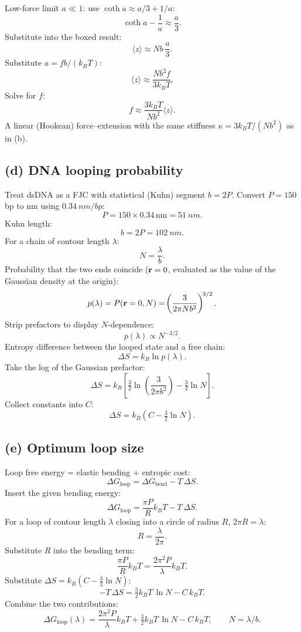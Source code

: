 \documentclass[11pt]{article}
\begin{document}
Low-force limit $a\ll 1$: use $\coth a\approx a/3 + 1/a$:
\[ \coth a - \frac{1}{a} \approx \frac{a}{3}. \]
Substitute into the boxed result:
\[ \langle z\rangle \approx N b\,\frac{a}{3}. \]
Substitute $a = fb/(k_BT)$:
\[ \langle z\rangle \approx \frac{N b^2 f}{3 k_B T}. \]
Solve for $f$:
\[ \boxed{\;f \approx \frac{3 k_B T}{N b^2}\langle z\rangle.\;} \]
A linear (Hookean) force--extension with the same stiffness $\kappa = 3 k_B T/(N b^2)$ as in (b).

\subsection*{(d) DNA looping probability}

Treat dsDNA as a FJC with statistical (Kuhn) segment $b = 2P$. Convert $P=150$ bp to nm using $\SI{0.34}{nm/bp}$:
\[ P = 150\times 0.34\,\text{nm} = \SI{51}{nm}. \]
Kuhn length:
\[ b = 2P = \SI{102}{nm}. \]
For a chain of contour length $\lambda$:
\[ N = \frac{\lambda}{b}. \]
Probability that the two ends coincide ($\vb r = 0$, evaluated as the value of the Gaussian density at the origin):
\[ p(\lambda) = P(\vb r=0,N) = \!\left(\frac{3}{2\pi N b^2}\right)^{\!3/2}. \]
Strip prefactors to display $N$-dependence:
\[ \boxed{\;p(\lambda) \propto N^{-3/2}.\;} \]
Entropy difference between the looped state and a free chain:
\[ \Delta S = k_B \ln p(\lambda). \]
Take the log of the Gaussian prefactor:
\[ \Delta S = k_B\!\left[\tfrac32\ln\!\left(\frac{3}{2\pi b^2}\right) - \tfrac32\ln N\right]. \]
Collect constants into $C$:
\[ \boxed{\;\Delta S = k_B\!\left(C - \tfrac32 \ln N\right).\;} \]

\subsection*{(e) Optimum loop size}

Loop free energy = elastic bending + entropic cost:
\[ \Delta G_\text{loop} = \Delta G_\text{bend} - T\,\Delta S. \]
Insert the given bending energy:
\[ \Delta G_\text{loop} = \frac{\pi P}{R} k_B T - T\,\Delta S. \]
For a loop of contour length $\lambda$ closing into a circle of radius $R$, $2\pi R = \lambda$:
\[ R = \frac{\lambda}{2\pi}. \]
Substitute $R$ into the bending term:
\[ \frac{\pi P}{R}k_B T = \frac{2\pi^2 P}{\lambda}k_B T. \]
Substitute $\Delta S = k_B(C - \tfrac32\ln N)$:
\[ -T\,\Delta S = \tfrac32 k_B T\,\ln N - C\,k_B T. \]
Combine the two contributions:
\[ \boxed{\;\Delta G_\text{loop}(\lambda) = \frac{2\pi^2 P}{\lambda}k_B T + \tfrac32 k_B T\,\ln N - C\,k_B T,\qquad N = \lambda/b.\;} \]
\end{document}
